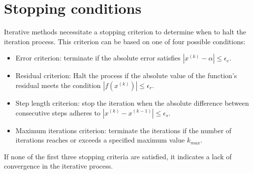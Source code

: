 \section{Stopping conditions}

Iterative methods necessitate a stopping criterion to determine when to halt the iteration process. 
This criterion can be based on one of four possible conditions:
\begin{itemize}
    \item Error criterion: terminate if the absolute error satisfies $\left\lvert x^{(k)}-\alpha \right\rvert \leq \epsilon_e$.
    \item Residual criterion: Halt the process if the absolute value of the function's residual meets the condition $\left\lvert f\left(x^{(k)}\right) \right\rvert \leq \epsilon_r$. 
    \item Step length criterion: stop the iteration when the absolute difference between consecutive steps adheres to $\left\lvert x^{(k)}-x^{(k-1)} \right\rvert \leq \epsilon_s$. 
    \item Maximum iterations criterion: terminate the iterations if the number of iterations reaches or exceeds a specified maximum value $k_{max}$. 
\end{itemize}
If none of the first three stopping criteria are satisfied, it indicates a lack of convergence in the iterative process.